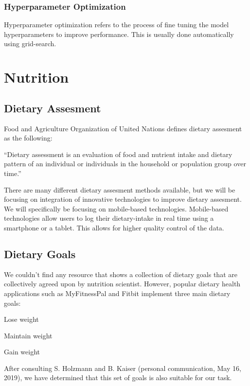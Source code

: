 \subsubsection{Hyperparameter Optimization}
Hyperparameter optimization refers to the process of fine tuning the model hyperparameters to improve performance.
This is usually done automatically using grid-search.\parencite{homl:2} 

\section{Nutrition}
\subsection{Dietary Assesment}
Food and Agriculture Organization of United Nations defines dietary assesment as the following:

``Dietary assessment is an evaluation of food and nutrient intake and dietary pattern of an individual or individuals in the household or population group over time.''
\parencite{faoun}

There are many different dietary assesment methods available, but we will be focusing on integration of innovative technologies to improve dietary assesment.
We will specifically be focusing on mobile-based technologies.
Mobile-based technologies allow users to log their dietary-intake in real time using a smartphone or a tablet.
This allows for higher quality control of the data.\parencite{faoun}
\subsection{Dietary Goals}
We couldn't find any resource that shows a collection of dietary goals that are collectively agreed upon by nutrition scientist.
However, popular dietary health applications such as MyFitnessPal and Fitbit implement three main dietary goals:

Lose weight

Maintain weight

Gain weight

After consulting S. Holzmann and B. Kaiser (personal communication, May 16, 2019), we have determined that this set of goals is also suitable for our task.
